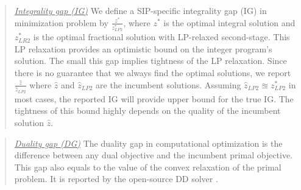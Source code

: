 \begin{quote}
\noindent\underline{\textit{Integrality gap (IG)}} We define a SIP-specific integrality gap (IG) in minimization problem by $\frac{z^*}{z^*_{LP2}}$, where $z^*$ is the optimal integral solution and $z^*_{LR2}$ is the optimal fractional solution with LP-relaxed second-stage. This LP relaxation provides an optimistic bound on the integer program's solution. The small this gap implies tightness of the LP relaxation. Since there is no guarantee that we always find the optimal solutions, we report $\frac{\hat{z}}{\hat{z}_{LP2}}$ where $\hat{z}$ and $\hat{z}_{LP2}$ are the incumbent solutions. Assuming $\hat{z}_{LP2}\approxeq z^*_{LP2}$ in most cases, the reported IG will provide upper bound for the true IG. The tightness of this bound highly depends on the quality of the incumbent solution $\hat{z}$.%
\end{quote}

\begin{quote}
\noindent\underline{\textit{Duality gap (DG)}} The duality gap in computational optimization is the difference between any dual objective and the incumbent primal objective. This gap also equals to the value of the convex relaxation of the primal problem. It is reported by the open-source DD solver \dsp.
\end{quote}


